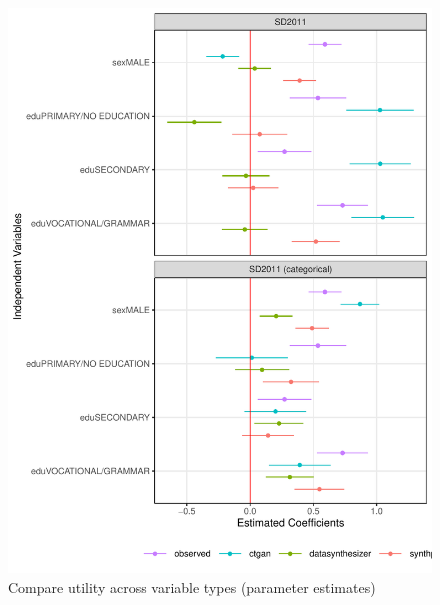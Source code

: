 \begin{figure}[ht]
  \caption{Compare utility across variable types (parameter estimates)}
  \label{fig:utility_compare_regression}
  \centering
    \includegraphics[width=\linewidth]{../graphs/graph_utility_compare_dataset.pdf}
\end{figure}

